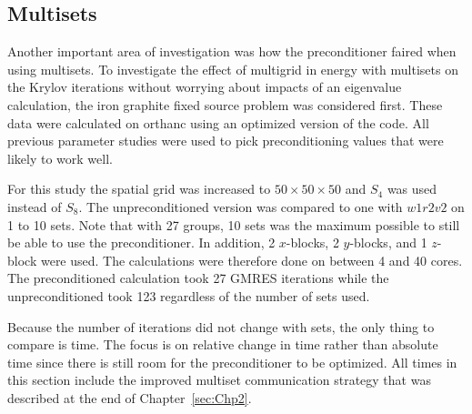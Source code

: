 \subsection{Multisets}
Another important area of investigation was how the preconditioner faired when using multisets. To investigate the effect of multigrid in energy with multisets on the Krylov iterations without worrying about impacts of an eigenvalue calculation, the iron graphite fixed source problem was considered first. These data were calculated on orthanc using an optimized version of the code. All previous parameter studies were used to pick preconditioning values that were likely to work well. 

For this study the spatial grid was increased to $50 \times 50 \times 50$ and $S_{4}$ was used instead of $S_{8}$. The unpreconditioned version was compared to one with $w1r2v2$ on 1 to 10 sets. Note that with 27 groups, 10 sets was the maximum possible to still be able to use the preconditioner. In addition, 2 $x$-blocks, 2 $y$-blocks, and 1 $z$-block were used. The calculations were therefore done on between 4 and 40 cores. The preconditioned calculation took 27 GMRES iterations while the unpreconditioned took 123 regardless of the number of sets used.

Because the number of iterations did not change with sets, the only thing to compare is time. The focus is on relative change in time rather than absolute time since there is still room for the preconditioner to be optimized. All times in this section include the improved multiset communication strategy that was described at the end of Chapter~\ref{sec:Chp2}. 

